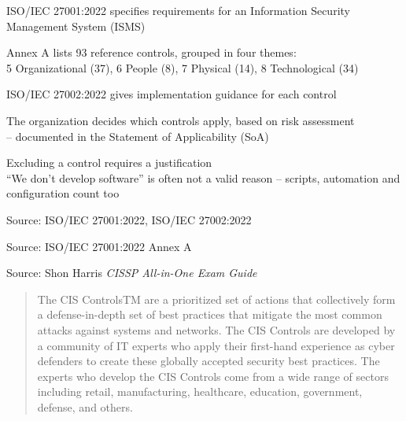 \documentclass[Screen16to9,17pt]{foils}
\begin{document}

\begin{list2}
\item ISO/IEC 27001:2022 specifies requirements for an Information Security Management System (ISMS)
\item Annex A lists 93 reference controls, grouped in four themes:\\
5 Organizational (37), 6 People (8), 7 Physical (14), 8 Technological (34)
\item ISO/IEC 27002:2022 gives implementation guidance for each control
\item The organization decides which controls apply, based on risk assessment\\
-- documented in the Statement of Applicability (SoA)
\item Excluding a control requires a justification\\
``We don't develop software'' is often not a valid reason -- scripts, automation and configuration count too
\end{list2}

Source: ISO/IEC 27001:2022, ISO/IEC 27002:2022




Source: ISO/IEC 27001:2022 Annex A




Source: Shon Harris \emph{CISSP All-in-One Exam Guide}



\begin{quote}
  The CIS ControlsTM are a prioritized set of actions that collectively form a defense-in-depth set
of best practices that mitigate the most common attacks against systems and networks. The
CIS Controls are developed by a community of IT experts who apply their first-hand experience
as cyber defenders to create these globally accepted security best practices. The experts who
develop the CIS Controls come from a wide range of sectors including retail, manufacturing,
healthcare, education, government, defense, and others.
\end{quote}
\end{document}
